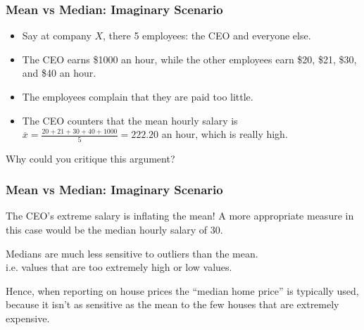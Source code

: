 \documentclass[handout]{beamer}
\newcommand{\blue}[1]{\textcolor{blue2}{#1}}
\begin{document}
\begin{frame}
\frametitle{Mean vs Median: Imaginary Scenario}


\begin{itemize}
\item Say at company $X$, there 5 employees:  the CEO and everyone else.  
\pause\item The CEO earns \$1000 an hour, while the other employees earn \$20, \$21, \$30, and \$40 an hour. 
\pause\item The employees complain that they are paid too little.  
\pause\item The CEO counters that the mean hourly salary is $\overline{x}=\frac{20+21+30+40+1000}{5} = 222.20$ an hour, which is really high.
\end{itemize}

\pause Why could you critique this argument?
\end{frame}


\begin{frame}
\frametitle{Mean vs Median: Imaginary Scenario}
The CEO's extreme salary is inflating the mean!  A more appropriate measure in this case would be the median hourly salary of $30$.

\vspace{0.5cm}

\pause Medians are much less sensitive to \blue{outliers} than the mean.\\
i.e. values that are  too extremely high or low values.

\vspace{0.5cm}

\pause Hence, when reporting on house prices the ``median home price'' is typically  used, because it isn't as sensitive as the mean to the few houses that are extremely expensive.
\end{frame}
\end{document}
